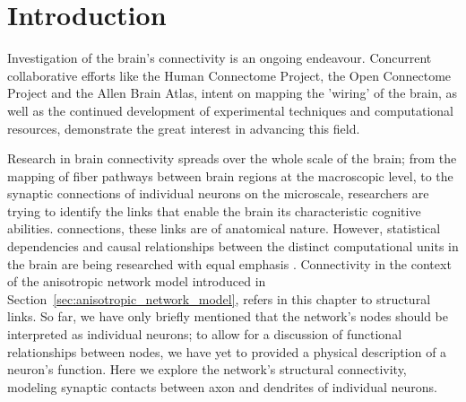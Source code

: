 
\section{Introduction}

Investigation 
of the brain's connectivity is an ongoing endeavour.  Concurrent
collaborative efforts like the Human Connectome Project, the Open
Connectome Project and the Allen Brain Atlas, intent on mapping the
'wiring' of the brain, as well as the continued development of
experimental techniques and computational resources, demonstrate
the
great interest in advancing this field.

Research in brain connectivity spreads over the whole scale
of the brain; from the mapping of fiber pathways between brain regions
at the macroscopic level, to the synaptic connections of individual
neurons on the microscale, researchers are trying to identify the
links that enable the brain its characteristic cognitive abilities.
connections, these links are of anatomical nature. However,
statistical dependencies and causal relationships between the distinct
computational units in the brain are being researched with equal
emphasis \parencite{Scholarpedia-BrainConnectivity}. Connectivity in
the context of the anisotropic network model introduced in
Section~\ref{sec:anisotropic_network_model}, refers in this chapter to
structural links. So far, we have only briefly mentioned that the
network's nodes should be interpreted as individual neurons; to allow
for a discussion of functional relationships between nodes, we have
yet to provided a physical description of a neuron's function. Here we
explore the network's structural connectivity, modeling synaptic
contacts between axon and dendrites of individual neurons.




